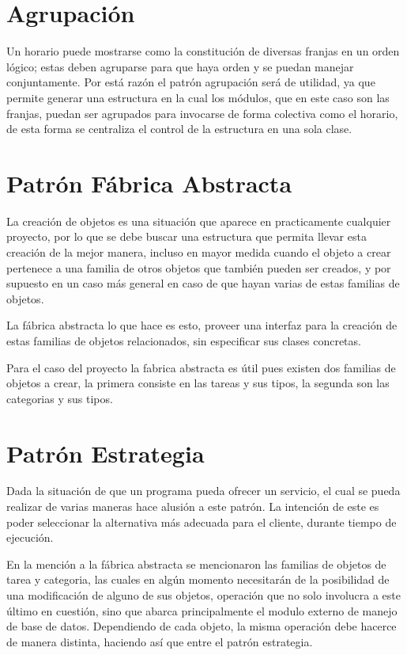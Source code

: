 \section{Agrupación}
Un horario puede mostrarse como la constitución de diversas franjas en un orden lógico; estas deben agruparse para que haya orden y se puedan manejar conjuntamente. Por está razón el patrón agrupación será de utilidad, ya que permite generar una estructura en la cual los módulos, que en este caso son las franjas, puedan ser agrupados para invocarse de forma colectiva como el horario, de esta forma se centraliza el control de la estructura en una sola clase.

\section{Patrón Fábrica Abstracta}
La creación de objetos es una situación que aparece en practicamente cualquier proyecto, por lo que se debe buscar una estructura que permita llevar esta creación de la mejor manera, incluso en mayor medida cuando el objeto a crear pertenece a una familia de otros objetos que también pueden ser creados, y por supuesto en un caso más general en caso de que hayan varias de estas familias de objetos.

La fábrica abstracta lo que hace es esto, proveer una interfaz para la creación de estas familias de objetos relacionados, sin especificar sus clases concretas.

Para el caso del proyecto la fabrica abstracta es útil pues existen dos familias de objetos a crear, la primera consiste en las tareas y sus tipos, la segunda son las categorias y sus tipos.


\section{Patrón Estrategia}
Dada la situación de que un programa pueda ofrecer un servicio, el cual se pueda realizar de varias maneras hace alusión a este patrón. La intención de este es poder seleccionar la alternativa más adecuada para el cliente, durante tiempo de ejecución.

En la mención a la fábrica abstracta se mencionaron las familias de objetos de tarea y categoria, las cuales en algún momento necesitarán de la posibilidad de una modificación de alguno de sus objetos, operación que no solo involucra a este último en cuestión, sino que abarca principalmente el modulo externo de manejo de base de datos. Dependiendo de cada objeto, la misma operación debe hacerce de manera distinta, haciendo así que entre el patrón estrategia.

